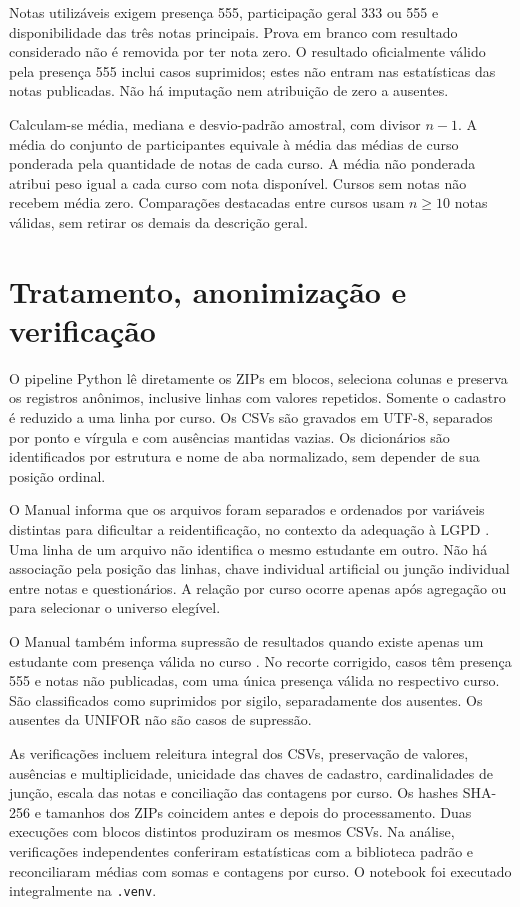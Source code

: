 \documentclass[12pt,a4paper]{article}
\begin{document}
Notas utilizáveis exigem presença 555, participação geral 333 ou 555 e
disponibilidade das três notas principais. Prova em branco com resultado
considerado não é removida por ter nota zero. O resultado oficialmente válido
pela presença 555 inclui casos suprimidos; estes não entram nas estatísticas
das notas publicadas. Não há imputação nem atribuição de zero a ausentes.

Calculam-se média, mediana e desvio-padrão amostral, com divisor $n-1$.
A média do conjunto de participantes equivale à média das médias de curso
ponderada pela quantidade de notas de cada curso. A média não ponderada
atribui peso igual a cada curso com nota disponível. Cursos sem notas não
recebem média zero. Comparações destacadas entre cursos usam $n\geq10$
notas válidas, sem retirar os demais da descrição geral.

\section{Tratamento, anonimização e verificação}
O pipeline Python lê diretamente os ZIPs em blocos, seleciona colunas e
preserva os registros anônimos, inclusive linhas com valores repetidos.
Somente o cadastro é reduzido a uma linha por curso. Os CSVs são gravados
em UTF-8, separados por ponto e vírgula e com ausências mantidas vazias.
Os dicionários são identificados por estrutura e nome de aba normalizado,
sem depender de sua posição ordinal.

O Manual informa que os arquivos foram separados e ordenados por variáveis
distintas para dificultar a reidentificação, no contexto da adequação à LGPD
\cite[pp.~6--7]{manual}. Uma linha de um arquivo não identifica o mesmo
estudante em outro. Não há associação pela posição das linhas, chave individual
artificial ou junção individual entre notas e questionários. A relação por
curso ocorre apenas após agregação ou para selecionar o universo elegível.

O Manual também informa supressão de resultados quando existe apenas um
estudante com presença válida no curso \cite[p.~7]{manual}. No recorte
corrigido, \TotalSuprimidos{} casos têm presença 555 e notas não publicadas,
com uma única presença válida no respectivo curso. São classificados como
suprimidos por sigilo, separadamente dos \TotalAusentes{} ausentes. Os
\UniforAusentes{} ausentes da UNIFOR não são casos de supressão.

As verificações incluem releitura integral dos CSVs, preservação de valores,
ausências e multiplicidade, unicidade das chaves de cadastro, cardinalidades
de junção, escala das notas e conciliação das contagens por curso. Os hashes
SHA-256 e tamanhos dos ZIPs coincidem antes e depois do processamento. Duas
execuções com blocos distintos produziram os mesmos CSVs. Na análise,
\TotalConferencias{} verificações independentes conferiram estatísticas com
a biblioteca padrão e reconciliaram médias com somas e contagens por curso.
O notebook foi executado integralmente na \texttt{.venv}.
\end{document}
